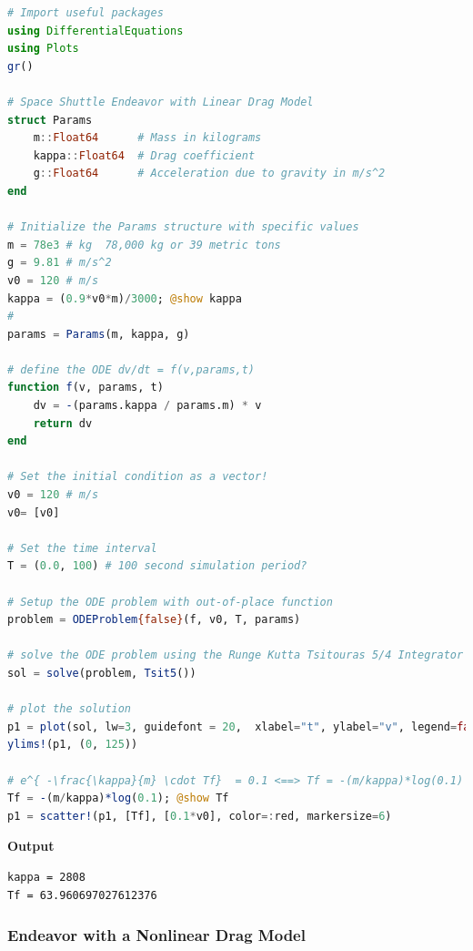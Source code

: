 \begin{lstlisting}[language=Julia,style=mystyle]
# Import useful packages
using DifferentialEquations
using Plots 
gr()

# Space Shuttle Endeavor with Linear Drag Model
struct Params
    m::Float64      # Mass in kilograms
    kappa::Float64  # Drag coefficient
    g::Float64      # Acceleration due to gravity in m/s^2
end

# Initialize the Params structure with specific values
m = 78e3 # kg  78,000 kg or 39 metric tons
g = 9.81 # m/s^2
v0 = 120 # m/s
kappa = (0.9*v0*m)/3000; @show kappa
#
params = Params(m, kappa, g)

# define the ODE dv/dt = f(v,params,t)
function f(v, params, t)
    dv = -(params.kappa / params.m) * v
    return dv
end

# Set the initial condition as a vector!
v0 = 120 # m/s 
v0= [v0]

# Set the time interval
T = (0.0, 100) # 100 second simulation period?

# Setup the ODE problem with out-of-place function
problem = ODEProblem{false}(f, v0, T, params)

# solve the ODE problem using the Runge Kutta Tsitouras 5/4 Integrator
sol = solve(problem, Tsit5())

# plot the solution
p1 = plot(sol, lw=3, guidefont = 20,  xlabel="t", ylabel="v", legend=false, color=:blue)
ylims!(p1, (0, 125))

# e^{ -\frac{\kappa}{m} \cdot Tf}  = 0.1 <==> Tf = -(m/kappa)*log(0.1)
Tf = -(m/kappa)*log(0.1); @show Tf
p1 = scatter!(p1, [Tf], [0.1*v0], color=:red, markersize=6)
\end{lstlisting}
\textbf{Output} 
\begin{verbatim}
kappa = 2808
Tf = 63.960697027612376
\end{verbatim}



\subsubsection{Endeavor with a Nonlinear Drag Model}


